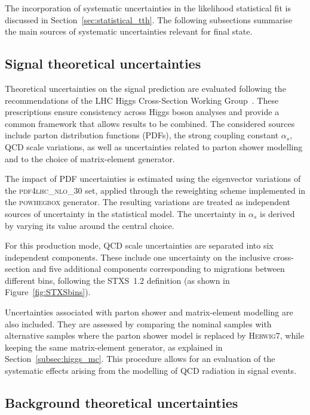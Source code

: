 The incorporation of systematic uncertainties in the likelihood statistical fit is discussed in Section~\ref{sec:statistical_tth}. The following subsections summarise the main sources of systematic uncertainties relevant for \ttHtt final state.

\subsection{Signal theoretical uncertainties}
\label{subsec:signal_theo_syst}

Theoretical uncertainties on the \ttH signal prediction are evaluated following the recommendations of the LHC Higgs Cross-Section Working Group~\cite{https://doi.org/10.23731/cyrm-2017-002, https://doi.org/10.5170/cern-2013-004}. These prescriptions ensure consistency across Higgs boson analyses and provide a common framework that allows results to be combined. The considered sources include parton distribution functions (PDFs), the strong coupling constant $\alpha_{s}$, QCD scale variations, as well as uncertainties related to parton shower modelling and to the choice of matrix-element generator.  

The impact of PDF uncertainties is estimated using the eigenvector variations of the \textsc{pdf4lhc\_nlo\_30} set, applied through the reweighting scheme implemented in the \textsc{powhegbox} generator. The resulting variations are treated as independent sources of uncertainty in the statistical model. The uncertainty in $\alpha_{s}$ is derived by varying its value around the central choice. 

For this production mode, QCD scale uncertainties are separated into six independent components. These include one uncertainty on the inclusive cross-section and five additional components corresponding to migrations between different \pth bins, following the STXS~1.2 definition (as shown in Figure~\ref{fig:STXSbins}).

Uncertainties associated with parton shower and matrix-element modelling are also included. They are assessed by comparing the nominal samples with alternative samples where the parton shower model is replaced by \textsc{Herwig7}, while keeping the same matrix-element generator, as explained in Section~\ref{subsec:higgs_mc}. This procedure allows for an evaluation of the systematic effects arising from the modelling of QCD radiation in \ttH signal events.

\subsection{Background theoretical uncertainties}
\label{subsec:bkg_theo_syst}

